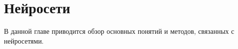 \chapter{Нейросети}

В данной главе приводится обзор основных понятий и методов, связанных с нейросетями.
